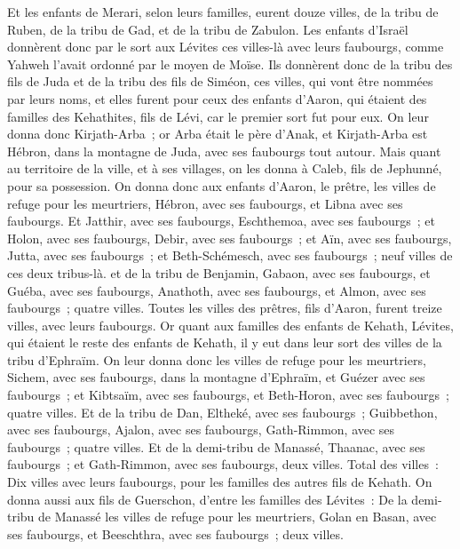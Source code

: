 \begin{multicols}{2}
Et les enfants de Merari, selon leurs familles, eurent douze villes, de la tribu de Ruben, de la tribu de Gad, et de la tribu de Zabulon.
Les enfants d'Israël donnèrent donc par le sort aux Lévites ces villes-là avec leurs faubourgs, comme Yahweh l'avait ordonné par le moyen de Moïse.
Ils donnèrent donc de la tribu des fils de Juda et de la tribu des fils de Siméon, ces villes, qui vont être nommées par leurs noms,
et elles furent pour ceux des enfants d'Aaron, qui étaient des familles des Kehathites, fils de Lévi, car le premier sort fut pour eux. 
On leur donna donc Kirjath-Arba~; or Arba était le père d'Anak, et Kirjath-Arba est Hébron, dans la montagne de Juda, avec ses faubourgs tout autour. 
Mais quant au territoire de la ville, et à ses villages, on les donna à Caleb, fils de Jephunné, pour sa possession.
On donna donc aux enfants d'Aaron, le prêtre, les villes de refuge pour les meurtriers, Hébron, avec ses faubourgs, et Libna avec ses faubourgs.
Et Jatthir, avec ses faubourgs, Eschthemoa, avec ses faubourgs~;
et Holon, avec ses faubourgs, Debir, avec ses faubourgs~;
et Aïn, avec ses faubourgs, Jutta, avec ses faubourgs~; et Beth-Schémesch, avec ses faubourgs~; neuf villes de ces deux tribus-là.
et de la tribu de Benjamin, Gabaon, avec ses faubourgs, et Guéba, avec ses faubourgs,
Anathoth, avec ses faubourgs, et Almon, avec ses faubourgs~; quatre villes.
Toutes les villes des prêtres, fils d'Aaron, furent treize villes, avec leurs faubourgs.
Or quant aux familles des enfants de Kehath, Lévites, qui étaient le reste des enfants de Kehath, il y eut dans leur sort des villes de la tribu d'Ephraïm.
On leur donna donc les villes de refuge pour les meurtriers, Sichem, avec ses faubourgs, dans la montagne d'Ephraïm, et Guézer avec ses faubourgs~;
et Kibtsaïm, avec ses faubourgs, et Beth-Horon, avec ses faubourgs~; quatre villes.
Et de la tribu de Dan, Eltheké, avec ses faubourgs~; Guibbethon, avec ses faubourgs,
Ajalon, avec ses faubourgs, Gath-Rimmon, avec ses faubourgs~; quatre villes.
Et de la demi-tribu de Manassé, Thaanac, avec ses faubourgs~; et Gath-Rimmon, avec ses faubourgs, deux villes.
Total des villes~: Dix villes avec leurs faubourgs, pour les familles des autres fils de Kehath.
On donna aussi aux fils de Guerschon, d'entre les familles des Lévites~: De la demi-tribu de Manassé les villes de refuge pour les meurtriers, Golan en Basan, avec ses faubourgs, et Beeschthra, avec ses faubourgs~; deux villes.

\end{multicols}

